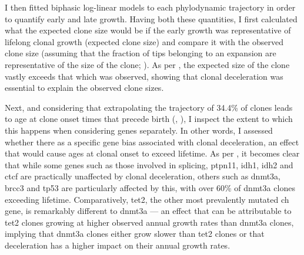 \begin{figure}[!ht]
	\label{fig:trajectories-fabre-mitchell}
\end{figure}

I then fitted biphasic log-linear models to each phylodynamic trajectory in order to quantify early and late growth. Having both these quantities, I first calculated what the expected clone size would be if the early growth was representative of lifelong clonal growth (expected clone size) and compare it with the observed clone size (assuming that the fraction of tips belonging to an expansion are representative of the size of the clone; ). As per , the expected size of the clone vastly exceeds that which was observed, showing that clonal deceleration was essential to explain the observed clone sizes.

\begin{figure}[!ht]
	\label{fig:expected-observed-ratio-representation}
\end{figure}

\begin{figure}[!ht]
	\label{fig:expected-observed-ratio}
\end{figure}

Next, and considering that extrapolating the trajectory of 34.4\% of clones leads to age at clone onset times that precede birth (, ), I inspect the extent to which this happens when considering genes separately. In other words, I assessed whether there as a specific gene bias associated with clonal deceleration, an effect that would cause ages at clonal onset to exceed lifetime. As per , it becomes clear that while some genes such as those involved in splicing, \ac{ptpn11}, \ac{idh1}, \ac{idh2} and \ac{ctcf} are practically unaffected by clonal deceleration, others such as \ac{dnmt3a}, \ac{brcc3} and \ac{tp53} are particularly affected by this, with over 60\% of \ac{dnmt3a} clones exceeding lifetime. Comparatively, \ac{tet2}, the other most prevalently mutated \ac{ch} gene, is remarkably different to \ac{dnmt3a} --- an effect that can be attributable to \ac{tet2} clones growing at higher observed annual growth rates than \ac{dnmt3a} clones, implying that \ac{dnmt3a} clones either grow slower than \ac{tet2} clones or that deceleration has a higher impact on their annual growth rates. 

